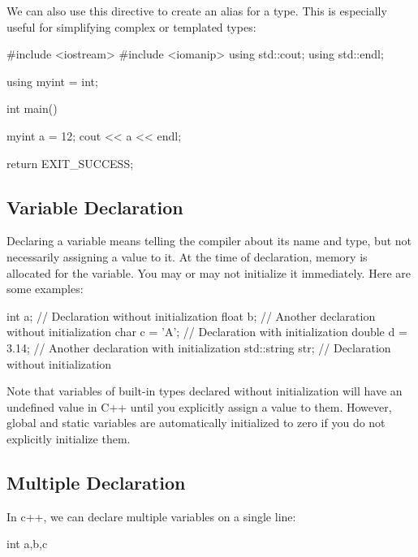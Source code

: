 \documentclass{report}
\begin{document}
    \bigbreak \noindent 
    We can also use this directive to create an alias for a type. This is especially useful for simplifying complex or templated types:
    \bigbreak \noindent 
    
    \begin{cppcode}
#include <iostream>
#include <iomanip>
using std::cout;
using std::endl;

using myint = int;

int main() {
    
    myint a = 12;
    cout << a << endl;

    return EXIT_SUCCESS;
}
    \end{cppcode}
    

    \pagebreak
    \subsection{Variable Declaration}
    \bigbreak \noindent 
    Declaring a variable means telling the compiler about its name and type, but not necessarily assigning a value to it. At the time of declaration, memory is allocated for the variable. You may or may not initialize it immediately. Here are some examples:
    \bigbreak \noindent 
    
    \begin{cppcode}
int a;              // Declaration without initialization
float b;            // Another declaration without initialization
char c = 'A';       // Declaration with initialization
double d = 3.14;    // Another declaration with initialization
std::string str;    // Declaration without initialization
    \end{cppcode}
    
    \bigbreak \noindent 
    Note that variables of built-in types declared without initialization will have an undefined value in C++ until you explicitly assign a value to them. However, global and static variables are automatically initialized to zero if you do not explicitly initialize them.

    \bigbreak \noindent 
    \subsection{Multiple Declaration}
    \bigbreak \noindent 
    In c++, we can declare multiple variables on a single line:
    \bigbreak \noindent 
    
    \begin{cppcode}
int a,b,c
    \end{cppcode}
    
\end{document}
